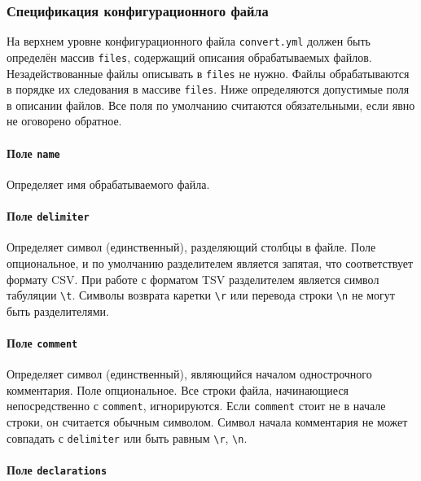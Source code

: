 \subsubsection{Спецификация конфигурационного файла}

На верхнем уровне конфигурационного файла \texttt{convert.yml} должен быть определён массив \texttt{files}, содержащий
описания обрабатываемых файлов. Незадействованные файлы описывать в \texttt{files} не нужно. Файлы обрабатываются в порядке
их следования в массиве \texttt{files}. Ниже определяются допустимые поля в описании файлов. Все поля по умолчанию считаются
обязательными, если явно не оговорено обратное.

\paragraph{Поле \texttt{name}}

Определяет имя обрабатываемого файла.
\paragraph{Поле \texttt{delimiter}}

Определяет символ (единственный), разделяющий столбцы в файле. Поле опциональное, и по умолчанию разделителем является
запятая, что соответствует формату CSV. При работе с форматом TSV разделителем является символ табуляции
\texttt{\textbackslash t}. Символы возврата каретки \texttt{\textbackslash r} или перевода строки
\texttt{\textbackslash n} не могут быть разделителями.

\paragraph{Поле \texttt{comment}}

Определяет символ (единственный), являющийся началом однострочного комментария. Поле опциональное.
Все строки файла, начинающиеся непосредственно с \texttt{comment}, игнорируются. Если \texttt{comment}
стоит не в начале строки, он считается обычным символом. Символ начала комментария не может совпадать с
\texttt{delimiter} или быть равным \texttt{\textbackslash r}, \texttt{\textbackslash n}.

\paragraph{Поле \texttt{declarations}}

